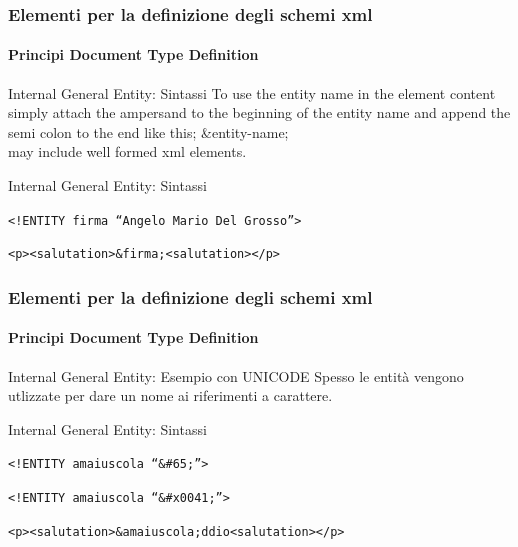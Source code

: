 \begin{frame}
    \frametitle{Elementi per la definizione degli schemi xml}
    \framesubtitle{Principi Document Type Definition}
    \addtocounter{nframe}{1}

    \begin{block}{Internal General Entity: Sintassi}
        To use the entity name in the element content simply attach the ampersand to
        the beginning of the entity name and append the semi colon to the end like
        this; \&entity-name;
        \\ may include well formed xml elements.
    \end{block}

    \begin{block}{Internal General Entity: Sintassi}
    \begin{center}\texttt{<!ENTITY firma ``Angelo Mario Del Grosso''>}\end{center}
    \begin{center}\texttt{<p><salutation>\&firma;<salutation></p>}\end{center}
    \end{block}

\end{frame}

\begin{frame}
    \frametitle{Elementi per la definizione degli schemi xml}
    \framesubtitle{Principi Document Type Definition}
    \addtocounter{nframe}{1}

    \begin{block}{Internal General Entity: Esempio con UNICODE}
        Spesso le entità vengono utlizzate per dare un nome ai riferimenti a carattere.
    \end{block}

    \begin{block}{Internal General Entity: Sintassi}
    \begin{center}\texttt{<!ENTITY amaiuscola ``\&\#65;''>}\end{center}
    \begin{center}\texttt{<!ENTITY amaiuscola ``\&\#x0041;''>}\end{center}
    \begin{center}\texttt{<p><salutation>\&amaiuscola;ddio<salutation></p>}\end{center}
    \end{block}

\end{frame}

